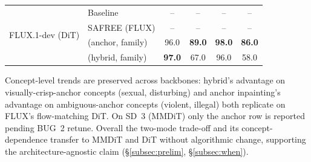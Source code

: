 \begin{table}[!tb]
\begin{tabular}{llcccc}
    \midrule
    \multirow{4}{*}{FLUX.1-dev (DiT)}
      & Baseline                  & -- & -- & -- & -- \\
      & SAFREE (FLUX)             & -- & -- & -- & -- \\
      & \cellcolor{blue!8}\ours{} (anchor, family) & \cellcolor{blue!8}96.0 & \cellcolor{blue!8}\textbf{89.0} & \cellcolor{blue!8}\textbf{98.0} & \cellcolor{blue!8}\textbf{86.0} \\
      & \cellcolor{blue!8}\ours{} (hybrid, family) & \cellcolor{blue!8}\textbf{97.0} & \cellcolor{blue!8}67.0 & \cellcolor{blue!8}96.0 & \cellcolor{blue!8}58.0 \\
    \bottomrule
    \end{tabular}

    \vspace{0.4em}
    {\footnotesize Concept-level trends are preserved across backbones: hybrid's advantage on visually-crisp-anchor concepts (sexual, disturbing) and anchor inpainting's advantage on ambiguous-anchor concepts (violent, illegal) both replicate on FLUX's flow-matching DiT. On SD~3 (MMDiT) only the anchor row is reported pending BUG~2 retune. Overall the two-mode trade-off and its concept-dependence transfer to MMDiT and DiT without algorithmic change, supporting the architecture-agnostic claim (\S\ref{subsec:prelim}, \S\ref{subsec:when}).}
\end{table}
